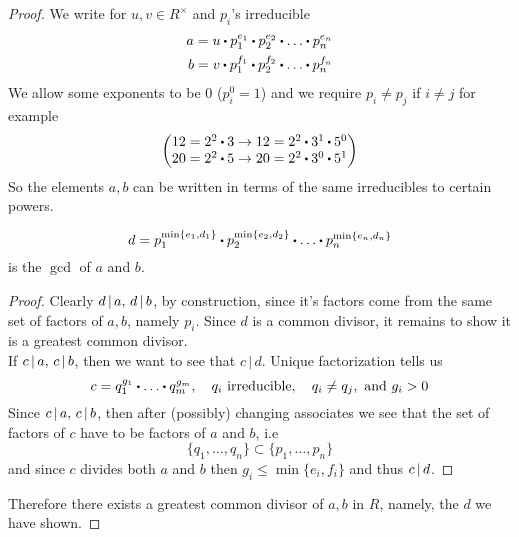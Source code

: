 \documentclass[../Main.tex]{subfiles}
\begin{document}
\begin{proof}
	We write for $u,v\in R^\times$ and $p_i$'s irreducible
	\begin{align*}
	a=u\rdot p_1^{e_1}\rdot p_2^{e_2}\rdot \dots \rdot p_n^{e_n}\\
	b=v\rdot p_1^{f_1}\rdot p_2^{f_2}\rdot \dots \rdot p_n^{f_n}
	\end{align*}
	We allow some exponents to be $0$ ($p_i^0=1$) and we require $p_i\ne p_j$ if $i\ne j$ for example
	\[\begin{pmatrix}
	12=2^2\rdot 3 \to 12= 2^2\rdot 3^1\rdot 5^0 \\
	20=2^2\rdot 5 \to 20 =2^2\rdot 3^0\rdot 5^1 
	\end{pmatrix}\]
	So the elements $a,b$ can be written in terms of the same irreducibles to certain powers.
	\begin{claim}
		\[d=p_1^{\min\{e_1,d_1\}}\rdot p_2^{\min\{e_2,d_2\}}\rdot \dots \rdot p_n^{\min\{e_n,d_n\}}\]
		is the $\gcd$ of $a$ and $b$.
	\end{claim}
	\begin{proof}
		Clearly $d \, | \, a,\, d \, | \, b$, by construction, since it's factors come from the same set of factors of $a,b$, namely $p_i$. Since $d$ is a common divisor, it remains to show it is a greatest common divisor.\\
		If $c \, | \, a, \, c \, | \, b$, then we want to see that $c\,|\, d$. 
		Unique factorization tells us
		\[c=q_1^{g_1}\rdot \dots \rdot q_m^{g_m}, \quad q_i \text{ irreducible},\quad  q_i\ne q_j, \text{ and } g_i>0\]
		Since $c \, | \, a,\, c \, | \, b$, then after (possibly) changing associates we see that the set of factors of $c$ have to be factors of $a$ and $b$, i.e
		\[\{q_1,\dots,q_n\}\subset \{p_1,\dots,p_n\}\]
		and since $c$ divides both $a$ and $b$ then $g_i\le \min\{e_i,f_i\}$ and thus $c \, | \, d$.
	\end{proof}
	Therefore there exists a greatest common divisor of $a,b$ in $R$, namely, the $d$ we have shown.
\end{proof}
\end{document}
